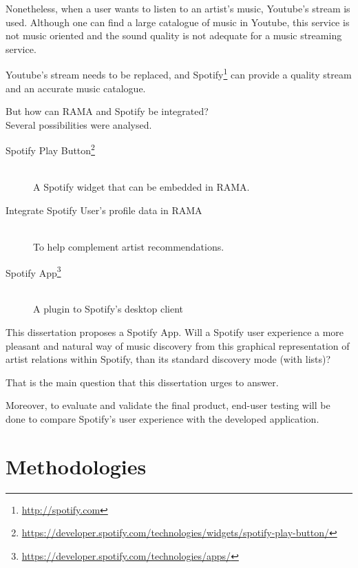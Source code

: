   Nonetheless, when a user wants to listen to an artist's music, Youtube's stream is used.
  Although one can find a large catalogue of music in Youtube, this service is not music oriented and the sound quality is not adequate for a music streaming service.

  Youtube's stream needs to be replaced, and Spotify\footnote{\url{http://spotify.com}} can provide a quality stream and an accurate music catalogue.

  But how can RAMA and Spotify be integrated? \\

  Several possibilities were analysed.

  \begin{description}
    \item[Spotify Play Button\footnote{\url{https://developer.spotify.com/technologies/widgets/spotify-play-button/}}] \hfill \\
      A Spotify widget that can be embedded in RAMA. 
    \item[Integrate Spotify User's profile data in RAMA] \hfill \\
      To help complement artist recommendations.
    \item[Spotify App\footnote{\url{https://developer.spotify.com/technologies/apps/}}] \hfill \\
      A plugin to Spotify's desktop client
  \end{description}

  This dissertation proposes a Spotify App.
  Will a Spotify user experience a more pleasant and natural way of music discovery from this graphical representation of artist relations within Spotify, than its standard discovery mode (with lists)?

  That is the main question that this dissertation urges to answer.

  Moreover, to evaluate and validate the final product, end-user testing will be done to compare Spotify's user experience with the developed application. 

\section{Methodologies} %
\label{sec:methodologies}



